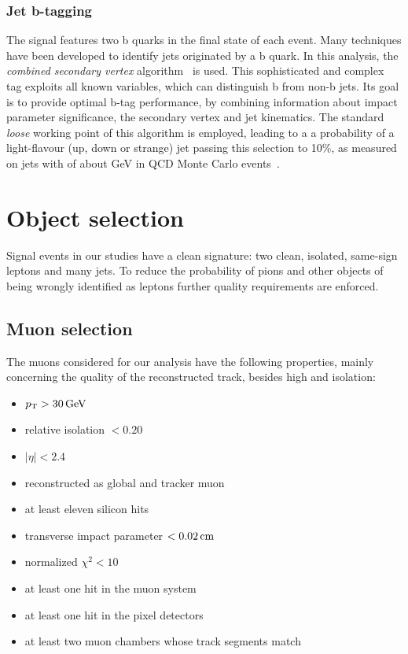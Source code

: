 \subsubsection{Jet b-tagging}\label{sec:btagging}
The signal features two b quarks in the final state of each event. Many
techniques have been developed to identify jets originated by a b quark. In
this analysis, the \emph{combined secondary
vertex} algorithm~\cite{CMS-PAS-BTV-09-001} is used. This sophisticated and complex tag exploits all known variables, which can distinguish b from non-b jets. Its goal is to provide optimal b-tag performance, by combining information about impact parameter significance, the secondary vertex and jet kinematics.
The standard \emph{loose} working point of this algorithm is employed, leading to a
a probability of a light-flavour (\ie up, down or strange) jet passing this selection to 10\%,
as measured on jets with \pt of about \unit[80]{GeV} in QCD Monte Carlo
events~\cite{CMS-PAS-BTV-11-001}.

\section{Object selection}
Signal events in our studies have a clean signature: two clean, isolated,
same-sign leptons and many jets. To reduce the probability of pions and
other objects of being wrongly identified as leptons further quality
requirements are enforced.
\subsection{Muon selection}\label{sec:muon_selection}
The muons considered for our analysis have the following properties, mainly
concerning the quality of the reconstructed track, besides high \pt and
isolation:
\begin{itemize}
    \item $\pt > \unit[30]{GeV}$
    \item relative isolation $< 0.20$
    \item $|\eta| < 2.4$
    \item reconstructed as global and tracker muon
    \item at least eleven silicon hits
    \item transverse impact parameter $< \unit[0.02]{cm}$
    \item normalized $\chi^2 < 10$
    \item at least one hit in the muon system
    \item at least one hit in the pixel detectors
    \item at least two muon chambers whose track segments match
\end{itemize}

